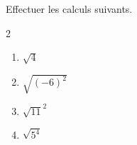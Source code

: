 \begin{exo}{}
	Effectuer les calculs suivants.
	\vspace*{-2mm}\begin{multicols}{2}
		\begin{enumerate}
			\item $\sqrt{4}$
			\item $\sqrt{(-6)^2}$
			\item $\sqrt{11}^2$
			\item $\sqrt{5^4}$
		\end{enumerate}
	\end{multicols}
\end{exo}
